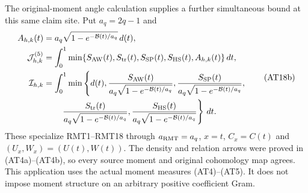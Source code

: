 The original-moment angle calculation supplies a further simultaneous
bound at this same claim site. Put $a_q=2q-1$ and
\[
 \begin{aligned}
 A_{h,k}(t)&=a_q\sqrt{1-e^{-\mathcal B(t)/a_q}}\,d(t),\\
 \mathcal J_{h,k}^{(5)}
   &=\int_0^1\min\{S_{\rm AW}(t),S_{\rm tr}(t),S_{\rm SP}(t),S_{\rm HS}(t),A_{h,k}(t)\}\,dt,\\
 \mathcal I_{h,k}
   &=\int_0^1\min\left\{d(t),
   \frac{S_{\rm AW}(t)}{a_q\sqrt{1-e^{-\mathcal B(t)/a_q}}},
   \frac{S_{\rm SP}(t)}{a_q\sqrt{1-e^{-\mathcal B(t)/a_q}}},\right.
 \\
 &\hspace{2em}\left.   \frac{S_{\rm tr}(t)}{a_q\sqrt{1-e^{-\mathcal B(t)/a_q}}},
   \frac{S_{\rm HS}(t)}{a_q\sqrt{1-e^{-\mathcal B(t)/a_q}}}\right\}\,dt .
 \end{aligned}
 \tag{AT18b}
\]
These specialize RMT1--RMT18 through $a_{\rm RMT}=a_q$, $x=t$, $C_x=C(t)$ and
$(U_x,W_x)=(U(t),W(t))$. The density and relation arrows were
proved in (AT4a)--(AT4b), so every source moment and original
cohomology map agrees. This application uses the actual moment
measures (AT4)--(AT5). It does not impose moment structure on an
arbitrary positive coefficient Gram.

